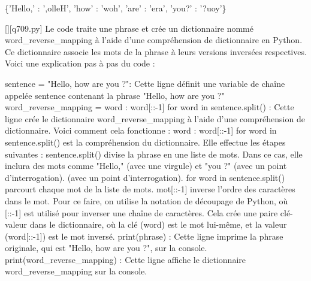 \{'Hello,' : ',olleH', 'how' : 'woh', 'are' : 'era', 'you?' : '?uoy'\}
        \par
        \begin{solution}
            \renewcommand{\nomfichier}{q709.py}
            \pythonfile{\chemincode \nomfichier}[][\nomfichier]
            Le code traite une phrase et crée un dictionnaire nommé word_reverse_mapping à l'aide d'une compréhension de dictionnaire en Python. Ce dictionnaire associe les mots de la phrase à leurs versions inversées respectives. Voici une explication pas à pas du code :

    sentence = "Hello, how are you ?": Cette ligne définit une variable de chaîne appelée sentence contenant la phrase "Hello, how are you ?"
    word_reverse_mapping = {word : word[::-1] for word in sentence.split()} : Cette ligne crée le dictionnaire word_reverse_mapping à l'aide d'une compréhension de dictionnaire. Voici comment cela fonctionne :
        {word : word[::-1] for word in sentence.split()} est la compréhension du dictionnaire. Elle effectue les étapes suivantes :
        sentence.split() divise la phrase en une liste de mots. Dans ce cas, elle inclura des mots comme "Hello," (avec une virgule) et "you ?" (avec un point d'interrogation). (avec un point d'interrogation).
        for word in sentence.split() parcourt chaque mot de la liste de mots.
        mot[::-1] inverse l'ordre des caractères dans le mot. Pour ce faire, on utilise la notation de découpage de Python, où [::-1] est utilisé pour inverser une chaîne de caractères.
        Cela crée une paire clé-valeur dans le dictionnaire, où la clé (word) est le mot lui-même, et la valeur (word[::-1]) est le mot inversé.
    print(phrase) : Cette ligne imprime la phrase originale, qui est "Hello, how are you ?", sur la console.
    print(word_reverse_mapping) : Cette ligne affiche le dictionnaire word_reverse_mapping sur la console.
        \end{solution}
        

